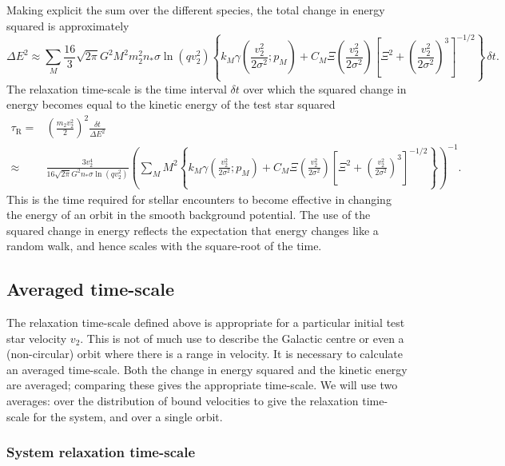 \documentclass[useAMS,usedcolumn,usegraphicx,usenatbib]{mn2e}
\newcommand{\sub}[1]{\ensuremath{_\mathrm{#1}}}
\begin{document}
\begin{onecolumn}
Making explicit the sum over the different species, the total change in energy squared is approximately
\begin{equation}
\Delta E^2 \approx \sum_M \frac{16}{3}\sqrt{2\pi}G^2 M^2m_2^2n_\ast\sigma\ln\left(qv_2^2\right) \left\{k_M \gamma\left(\frac{v_2^2}{2\sigma^2};p_M\right) + C_M\Xi\left(\frac{v_2^2}{2\sigma^2}\right)\left[\Xi^2 + \left(\frac{v_2^2}{2\sigma^2}\right)^3\right]^{-1/2}\right\}\,\delta t.
\end{equation}
The relaxation time-scale is the time interval $\delta t$ over which the squared change in energy becomes equal to the kinetic energy of the test star squared
\begin{align}
\tau\sub{R} = {} & \left(\frac{m_2v_2^2}{2}\right)^2\frac{\delta t}{\Delta E^2} \\
 \approx {} & \frac{3v_2^4}{16\sqrt{2\pi}G^2n_\ast\sigma\ln\left(qv_2^2\right)} \left(\sum_M M^2 \left\{k_M \gamma\left(\frac{v_2^2}{2\sigma^2};p_M\right) + C_M\Xi\left(\frac{v_2^2}{2\sigma^2}\right)\left[\Xi^2 + \left(\frac{v_2^2}{2\sigma^2}\right)^3\right]^{-1/2}\right\}\right)^{-1}.
\end{align}
This is the time required for stellar encounters to become effective in changing the energy of an orbit in the smooth background potential. The use of the squared change in energy reflects the expectation that energy changes like a random walk, and hence scales with the square-root of the time.

\subsection{Averaged time-scale}

The relaxation time-scale defined above is appropriate for a particular initial test star velocity $v_2$. This is not of much use to describe the Galactic centre or even a (non-circular) orbit where there is a range in velocity. It is necessary to calculate an averaged time-scale. Both the change in energy squared and the kinetic energy are averaged; comparing these gives the appropriate time-scale. We will use two averages: over the distribution of bound velocities to give the relaxation time-scale for the system, and over a single orbit.

\subsubsection{System relaxation time-scale}


\end{onecolumn}
\end{document}
